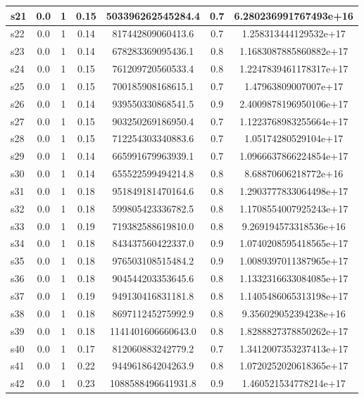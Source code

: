\documentclass{article}
\begin{document}
\begin{tabular}{|l|c|c|c|c|c|c|}
\hline
s21 &0.0 & 1 & 0.15 & 503396262545284.4 & 0.7 & 6.280236991767493e+16\\
\hline
s22 &0.0 & 1 & 0.14 & 817442809060413.6 & 0.7 & 1.258313444129532e+17\\
\hline
s23 &0.0 & 1 & 0.14 & 678283369095436.1 & 0.8 & 1.1683087885860882e+17\\
\hline
s24 &0.0 & 1 & 0.15 & 761209720560533.4 & 0.8 & 1.2247839461178317e+17\\
\hline
s25 &0.0 & 1 & 0.15 & 700185908168615.1 & 0.7 & 1.47963809007007e+17\\
\hline
s26 &0.0 & 1 & 0.14 & 939550330868541.5 & 0.9 & 2.4009878196950106e+17\\
\hline
s27 &0.0 & 1 & 0.15 & 903250269186950.4 & 0.7 & 1.1223768983255664e+17\\
\hline
s28 &0.0 & 1 & 0.15 & 712254303340883.6 & 0.7 & 1.05174280529104e+17\\
\hline
s29 &0.0 & 1 & 0.14 & 665991679963939.1 & 0.7 & 1.0966637866224854e+17\\
\hline
s30 &0.0 & 1 & 0.14 & 655522599494214.8 & 0.8 & 8.68870606218772e+16\\
\hline
s31 &0.0 & 1 & 0.18 & 951849181470164.6 & 0.8 & 1.2903777833064498e+17\\
\hline
s32 &0.0 & 1 & 0.18 & 599805423336782.5 & 0.8 & 1.1708554007925243e+17\\
\hline
s33 &0.0 & 1 & 0.19 & 719382588619810.0 & 0.8 & 9.269194573318536e+16\\
\hline
s34 &0.0 & 1 & 0.18 & 843437560422337.0 & 0.9 & 1.0740208595418565e+17\\
\hline
s35 &0.0 & 1 & 0.18 & 976503108515484.2 & 0.9 & 1.0089397011387965e+17\\
\hline
s36 &0.0 & 1 & 0.18 & 904544203353645.6 & 0.8 & 1.1332316633084085e+17\\
\hline
s37 &0.0 & 1 & 0.19 & 949130416831181.8 & 0.8 & 1.1405486065313198e+17\\
\hline
s38 &0.0 & 1 & 0.18 & 869711245275992.9 & 0.8 & 9.356029052394238e+16\\
\hline
s39 &0.0 & 1 & 0.18 & 1141401606660643.0 & 0.8 & 1.8288827378850262e+17\\
\hline
s40 &0.0 & 1 & 0.17 & 812060883242779.2 & 0.7 & 1.3412007353237413e+17\\
\hline
s41 &0.0 & 1 & 0.22 & 944961864204263.9 & 0.8 & 1.0720252020618365e+17\\
\hline
s42 &0.0 & 1 & 0.23 & 1088588496641931.8 & 0.9 & 1.460521534778214e+17\\

\end{tabular}
\end{document}

